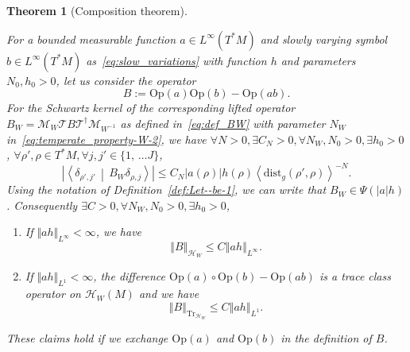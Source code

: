 \documentclass[10pt]{amsart}
\newtheorem{theo}{Theorem}[section]
\theoremstyle{definition}\newtheorem{defi}[theo]{Definition}\newtheorem{rema}[theo]{Remark}\newtheorem{exam}[theo]{Example}\newtheorem{exem}[theo]{Example}\newtheorem{nota}[theo]{Notation}
\newcommand{\clT}{\mathcal{T}}
\newcommand{\clH}{\mathcal{H}}
\newcommand{\clM}{\mathcal{M}}
\newcommand{\dist}{\mathrm{dist}}
\newcommand{\Opp}{\mathrm{Op}}
\newcommand{\Tr}{\mathrm{Tr}}
\let\oldexists\exists
\renewcommand*{\exists}{\mathrel{\oldexists}}
\let\oldforall\forall
\renewcommand*{\forall}{\mathrel{\oldforall}}
\begin{document}
\begin{tcolorbox}[enhanced, frame style={purple!80}, interior style={red!0},breakable]
\begin{theo}[Composition theorem]\label{thm:Composition-of-PDO.}

For a bounded measurable function $a\in L^{\infty}(T^{*}M)$ and slowly varying symbol $b\in L^{\infty}(T^{*}M)$ as~\eqref{eq:slow_variations} with function $h$ and parameters $N_{0},h_{0}>0$, let us consider the operator
\[
B:=\Opp \left(a\right)\Opp \left(b\right)-\Opp \left(ab\right).
\]
For the Schwartz kernel of the corresponding lifted operator $B_{W}=\clM_{W}\clT B\clT^{\dagger}\clM_{W^{-1}}$ as defined in~\eqref{eq:def_BW} with parameter $N_{W}$ in~\eqref{eq:temperate_property-W-2}, we have $\forall N>0,\exists C_{N}>0,\forall N_{W},N_{0}>0,\exists h_{0}>0$, $\forall\rho',\rho\in T^{*}M,\forall j,j'\in\{ 1,\,\ldots J\} $,
\[
\left|\left\langle\delta_{\rho',j'}\,\middle|\,B_{W}\delta_{\rho,j}\right\rangle\right|\leq C_{N}\left|a\left(\rho\right)\right|h\left(\rho\right)\left\langle \dist_{g}\left(\rho',\rho\right)\right\rangle^{-N}.
\]
Using the notation of Definition~\ref{def:Let--be-1}, we can write that $B_{W}\in\Psi(|a|h)$. Consequently $\exists C>0,\forall N_{W},N_{0}>0,\exists h_{0}>0$,
\begin{enumerate}
\item If $\Vert ah\Vert _{L^{\infty}}<\infty$, we have
\begin{equation}\label{eq:norm_Compos_PDO}
\left\Vert B\right\Vert _{\clH _{W}}\leq C\left\Vert ah\right\Vert _{L^{\infty}}.
\end{equation}
\item If $\Vert ah\Vert _{L^{1}}<\infty$, the difference $\Opp (a)\circ\Opp (b)-\Opp (ab)$ is a trace class operator on $\clH _{W}(M)$ and we have
\[
\left\Vert B\right\Vert _{\Tr_{\clH _{W}}}\leq C\left\Vert ah\right\Vert _{L^{1}}.
\]
\end{enumerate}
These claims hold if we exchange $\Opp (a)$ and $\Opp (b)$ in the definition of $B$.
\end{theo}
\end{tcolorbox}
\end{document}
